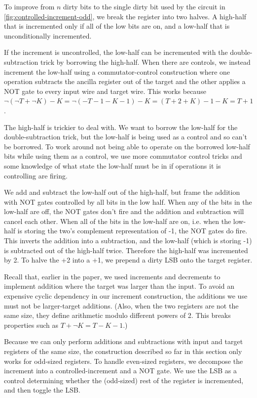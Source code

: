 \documentclass[twocolumn,longbibliography]{quantumarticle}
\begin{document}
To improve from $n$ dirty bits to the single dirty bit used by the circuit in \autoref{fig:controlled-increment-odd}, we break the register into two halves.
A high-half that is incremented only if all of the low bits are on, and a low-half that is unconditionally incremented.

If the increment is uncontrolled, the low-half can be incremented with the double-subtraction trick by borrowing the high-half.
When there are controls, we instead increment the low-half using a commutator-control construction where one operation subtracts the ancilla register out of the target and the other applies a NOT gate to every input wire and target wire.
This works because $\lnot (\lnot T + \lnot K) - K = \lnot (-T - 1 - K - 1) - K = (T+2+K) - 1 - K = T + 1$.

The high-half is trickier to deal with.
We want to borrow the low-half for the double-subtraction trick, but the low-half is being used as a control and so can't be borrowed.
To work around not being able to operate on the borrowed low-half bits while using them as a control, we use more commutator control tricks and some knowledge of what state the low-half must be in if operations it is controlling are firing.

We add and subtract the low-half out of the high-half, but frame the addition with NOT gates controlled by all bits in the low half.
When any of the bits in the low-half are off, the NOT gates don't fire and the addition and subtraction will cancel each other.
When all of the bits in the low-half are on, i.e. when the low-half is storing the two's complement representation of -1, the NOT gates do fire.
This inverts the addition into a subtraction, and the low-half (which is storing -1) is subtracted out of the high-half twice.
Therefore the high-half was incremented by 2.
To halve the +2 into a +1, we prepend a dirty LSB onto the target register.

Recall that, earlier in the paper, we used increments and decrements to implement addition where the target was larger than the input.
To avoid an expensive cyclic dependency in our increment construction, the additions we use must not be larger-target additions.
(Also, when the two registers are not the same size, they define arithmetic modulo different powers of 2.
This breaks properties such as $T + \lnot K = T - K - 1$.)

Because we can only perform additions and subtractions with input and target registers of the same size, the construction described so far in this section only works for odd-sized registers.
To handle even-sized registers, we decompose the increment into a controlled-increment and a NOT gate.
We use the LSB as a control determining whether the (odd-sized) rest of the register is incremented, and then toggle the LSB.
\end{document}
